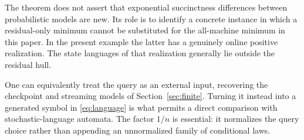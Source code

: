 The theorem does not assert that exponential succinctness differences
between probabilistic models are new. Its role is to identify a concrete
instance in which a residual-only minimum cannot be substituted for the
all-machine minimum in this paper. In the present example the latter
has a genuinely online positive realization. The state languages of
that realization generally lie outside the residual hull.

One can equivalently treat the query as an external input, recovering
the checkpoint and streaming models of Section~\ref{sec:finite}.
Turning it instead into a generated symbol in \eqref{eq:language} is
what permits a direct comparison with stochastic-language automata.
The factor $1/n$ is essential: it normalizes the query choice rather
than appending an unnormalized family of conditional laws.
